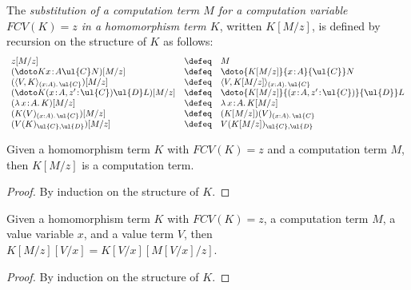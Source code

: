 \begin{definition}
The \emph{substitution of a computation term $M$ for a computation variable $FCV(K) = z$ in a homomorphism term $K$}, written $K[M/z]$, is defined by recursion on the structure of $K$ as follows:
\[
\begin{array}{l c l}
z[M/z] & \defeq & M
\\
(\doto K {x \!:\! A} {\ul{C}} N)[M/z] & \defeq & \doto {K[M/z]} {x \!:\! A} {\ul{C}} N
\\
(\langle V , K \rangle_{(x : A).\, \ul{C}})[M/z] & \defeq & \langle V , K[M/z] \rangle_{(x : A).\, \ul{C}}
\\
(\doto K {(x \!:\! A, z' \!:\! \ul{C})} {\ul{D}} L)[M/z] & \defeq & \doto {K[M/z]} {(x \!:\! A, z' \!:\! \ul{C})} {\ul{D}} L
\\
(\lambda \, x \!:\! A .\, K)[M/z] & \defeq & \lambda \, x \!:\! A .\, K[M/z]
\\
(K(V)_{(x : A).\, \ul{C}})[M/z] & \defeq & (K[M/z])(V)_{(x : A).\, \ul{C}}
\\
(V(K)_{\ul{C}, \ul{D}})[M/z] & \defeq & V(K[M/z])_{\ul{C}, \ul{D}}
\end{array}
\]
\end{definition}
\vspace{0.2cm}

\begin{proposition}
Given a homomorphism term $K$ with $FCV(K) = z$ and a computation term $M$, then $K[M/z]$ is a computation term.
\end{proposition}

\begin{proof}
By induction on the structure of $K$.
\end{proof}

\begin{proposition}
\label{prop:compsubstvaluesubst}
Given a homomorphism term $K$ with $FCV(K) = z$, a computation term $M$, a value variable $x$, and a value term $V$, then $K[M/z][V/x] = K[V/x][M[V/x]/z]$.
\end{proposition}

\begin{proof}
By induction on the structure of $K$.
\end{proof}

